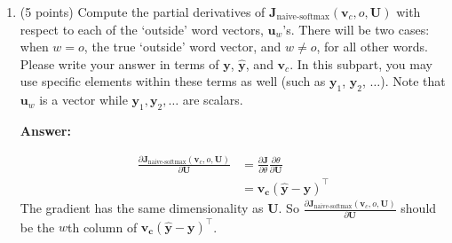 \documentclass{article}
\newenvironment{answer}{
        {\bf Answer:} \sf \begingroup\color{red}
    }{\endgroup}%
\begin{document}
\begin{enumerate}
        \begin{shaded}
            \begin{answer}
                \\
                $\theta = \bm{U}^{\top} \bm{v_c}\text{, where } \bm{U} \in \mathbb{R}^{|V|\times d}$
                \[
                    \begin{aligned}
                        \frac{\partial \bm J_{\text{naive-softmax}}(\bm v_c, o, \bm U)}{\partial \bm{v_c}}
                        &= \frac{\partial \bm{J}}{\partial \theta} \frac{\partial \theta}{\partial \bm{v_c}} \\
                        &= \bm{U} (\bm{\hat{y}}-\bm{y})
                    \end{aligned}
                \]
                The gradient has the same dimensionality as $\bm{v_c}$.
                It is zero when $ \hat{\bm{y}} = \bm{y} $.
                By subtracting this gradient, $\hat{\bm{v_c}}$ moves closer to the local minimum, thus becoming
                a more desirable vector.
            \end{answer}
        \end{shaded}

        \item (5 points) Compute the partial derivatives of $\bm J_{\text{naive-softmax}}(\bm v_c, o, \bm U)$ with respect to each of the `outside' word vectors, $\bm u_w$'s. There will be two cases: when $w=o$, the true `outside' word vector, and $w \neq o$, for all other words. Please write your answer in terms of $\bm y$, $\hat{\bm y}$, and $\bm v_c$. In this subpart, you may use specific elements within these terms as well (such as $\bm y_1$, $\bm y_2$, $\dots$). Note that $\bm u_w$ is a vector while $\bm y_1, \bm y_2, \dots$ are scalars.

        \begin{shaded}
            \begin{answer}
                \[
                    \begin{aligned}
                        \frac{\partial \bm J_{\text{naive-softmax}}(\bm v_c, o, \bm U)}{\partial \bm{U}}
                        &= \frac{\partial \bm{J}}{\partial \theta} \frac{\partial \theta}{\partial \bm{U}} \\
                        &= \bm{v_c} (\bm{\hat{y}}-\bm{y})^{\top}
                    \end{aligned}
                \]
                The gradient has the same dimensionality as $\bm{U}$.
                So $\frac{\partial \bm J_{\text{naive-softmax}}(\bm v_c, o, \bm U)}{\partial \bm{U}} $ should be
                the $w$th column of $\bm{v_c} (\bm{\hat{y}}-\bm{y})^{\top}$.
            \end{answer}
        \end{shaded}


\end{enumerate}
\end{document}
